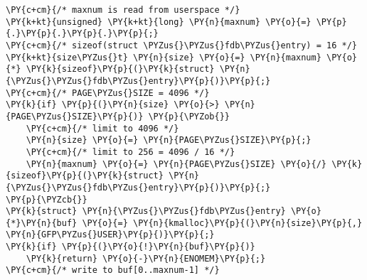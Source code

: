 \begin{Verbatim}[commandchars=\\\{\},codes={\catcode`\$=3\catcode`\^=7\catcode`\_=8}]
\PY{c+cm}{/* maxnum is read from userspace */}
\PY{k+kt}{unsigned} \PY{k+kt}{long} \PY{n}{maxnum} \PY{o}{=} \PY{p}{.}\PY{p}{.}\PY{p}{.}\PY{p}{;}
\PY{c+cm}{/* sizeof(struct \PYZus{}\PYZus{}fdb\PYZus{}entry) = 16 */}
\PY{k+kt}{size\PYZus{}t} \PY{n}{size} \PY{o}{=} \PY{n}{maxnum} \PY{o}{*} \PY{k}{sizeof}\PY{p}{(}\PY{k}{struct} \PY{n}{\PYZus{}\PYZus{}fdb\PYZus{}entry}\PY{p}{)}\PY{p}{;}
\PY{c+cm}{/* PAGE\PYZus{}SIZE = 4096 */}
\PY{k}{if} \PY{p}{(}\PY{n}{size} \PY{o}{>} \PY{n}{PAGE\PYZus{}SIZE}\PY{p}{)} \PY{p}{\PYZob{}}
    \PY{c+cm}{/* limit to 4096 */}
    \PY{n}{size} \PY{o}{=} \PY{n}{PAGE\PYZus{}SIZE}\PY{p}{;}
    \PY{c+cm}{/* limit to 256 = 4096 / 16 */}
    \PY{n}{maxnum} \PY{o}{=} \PY{n}{PAGE\PYZus{}SIZE} \PY{o}{/} \PY{k}{sizeof}\PY{p}{(}\PY{k}{struct} \PY{n}{\PYZus{}\PYZus{}fdb\PYZus{}entry}\PY{p}{)}\PY{p}{;}
\PY{p}{\PYZcb{}}
\PY{k}{struct} \PY{n}{\PYZus{}\PYZus{}fdb\PYZus{}entry} \PY{o}{*}\PY{n}{buf} \PY{o}{=} \PY{n}{kmalloc}\PY{p}{(}\PY{n}{size}\PY{p}{,} \PY{n}{GFP\PYZus{}USER}\PY{p}{)}\PY{p}{;}
\PY{k}{if} \PY{p}{(}\PY{o}{!}\PY{n}{buf}\PY{p}{)}
    \PY{k}{return} \PY{o}{-}\PY{n}{ENOMEM}\PY{p}{;}
\PY{c+cm}{/* write to buf[0..maxnum-1] */}
\end{Verbatim}
